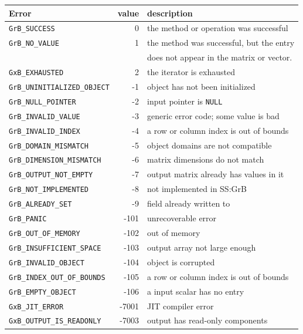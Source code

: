 \vspace{0.2in}
\noindent
{\small
\begin{tabular}{lrp{2.8in}}
\hline
Error                         & value & description \\
\hline
\verb'GrB_SUCCESS'              & 0   & the method or operation was successful \\
\verb'GrB_NO_VALUE'             & 1   & the method was successful, but the entry \\
                                &     & does not appear in the matrix or vector. \\
\verb'GxB_EXHAUSTED'            & 2   & the iterator is exhausted \\
\hline
\hline
\verb'GrB_UNINITIALIZED_OBJECT' & -1   & object has not been initialized \\
\verb'GrB_NULL_POINTER'         & -2   & input pointer is \verb'NULL' \\
\verb'GrB_INVALID_VALUE'        & -3   & generic error code; some value is bad \\
\verb'GrB_INVALID_INDEX'        & -4   & a row or column index is out of bounds \\
\verb'GrB_DOMAIN_MISMATCH'      & -5   & object domains are not compatible \\
\verb'GrB_DIMENSION_MISMATCH'   & -6   & matrix dimensions do not match \\
\verb'GrB_OUTPUT_NOT_EMPTY'     & -7   & output matrix already has values in it \\
\verb'GrB_NOT_IMPLEMENTED'      & -8   & not implemented in SS:GrB \\
\verb'GrB_ALREADY_SET'          & -9   & field already written to \\
\verb'GrB_PANIC'                & -101 & unrecoverable error \\
\verb'GrB_OUT_OF_MEMORY'        & -102 & out of memory \\
\verb'GrB_INSUFFICIENT_SPACE'   & -103 & output array not large enough \\
\verb'GrB_INVALID_OBJECT'       & -104 & object is corrupted \\
\verb'GrB_INDEX_OUT_OF_BOUNDS'  & -105 & a row or column index is out of bounds \\
\verb'GrB_EMPTY_OBJECT'         & -106 & a input scalar has no entry \\
\verb'GxB_JIT_ERROR'            &-7001 & JIT compiler error \\
\verb'GxB_OUTPUT_IS_READONLY'   &-7003 & output has read-only components \\
\hline
\end{tabular}
\vspace{0.2in}
}

